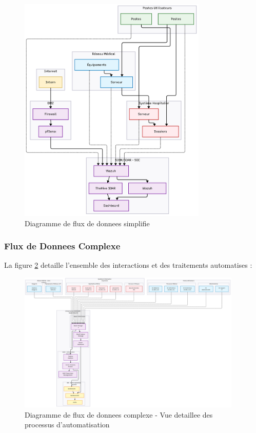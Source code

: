 \begin{figure}[H]
    \centering
    \includegraphics[width=0.8\textwidth]{images/flowData_simple.png}
    \caption{Diagramme de flux de donnees simplifie}
    \label{fig:flow_simple}
\end{figure}

\subsubsection{Flux de Donnees Complexe}

La figure \ref{fig:flow_complex} detaille l'ensemble des interactions et des traitements automatises :

\begin{figure}[H]
    \centering
    \includegraphics[width=0.95\textwidth]{images/flowData_Complex.png}
    \caption{Diagramme de flux de donnees complexe - Vue detaillee des processus d'automatisation}
    \label{fig:flow_complex}
\end{figure}

